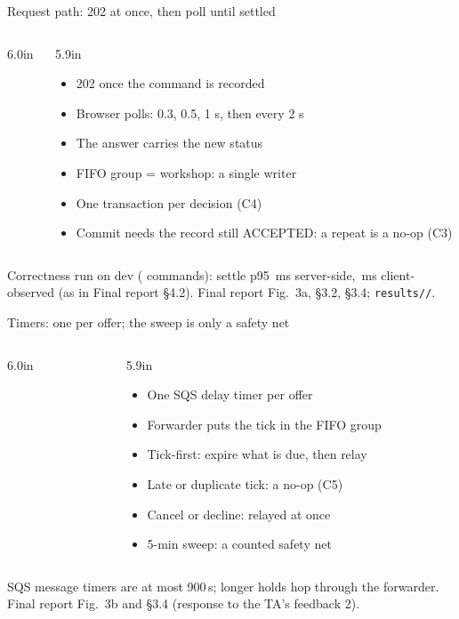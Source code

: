 \documentclass[t,20pt]{beamer}
\newcommand{\code}[1]{\texttt{#1}}
\newcommand{\source}[1]{\par\vfill{\fontsize{13}{15}\selectfont\color{srMuted}#1\par}\vspace{0.06in}}
\begin{document}
\begin{frame}{Request path: 202 at once, then poll until settled}
  \begin{columns}[T,onlytextwidth]
    \begin{column}{6.0in}
    \end{column}
    \begin{column}{5.9in}
      \vspace{0.30in}
      \begin{itemize}
        \setlength{\itemsep}{0.45em}
        \item 202 once the command is recorded
        \item Browser polls: 0.3, 0.5, 1 s, then every 2 s
        \item The answer carries the new status
        \item FIFO group = workshop: a single writer
        \item One transaction per decision (C4)
        \item Commit needs the record still ACCEPTED: a repeat is a no-op (C3)
      \end{itemize}
    \end{column}
  \end{columns}
  \source{Correctness run on dev (\CorrectnessSettleClientN{} commands): settle p95 \CorrectnessSettleServerPNinetyFiveMs\,ms
    server-side, \CorrectnessSettleClientPNinetyFiveMs\,ms client-observed (as in Final report \S4.2). Final report
    Fig.~3a, \S3.2, \S3.4; \code{results/\CorrectnessDir/}.}
\end{frame}

\begin{frame}{Timers: one per offer; the sweep is only a safety net}
  \begin{columns}[T,onlytextwidth]
    \begin{column}{6.0in}
    \end{column}
    \begin{column}{5.9in}
      \vspace{0.30in}
      \begin{itemize}
        \setlength{\itemsep}{0.45em}
        \item One SQS delay timer per offer
        \item Forwarder puts the tick in the FIFO group
        \item Tick-first: expire what is due, then relay
        \item Late or duplicate tick: a no-op (C5)
        \item Cancel or decline: relayed at once
        \item 5-min sweep: a counted safety net
      \end{itemize}
    \end{column}
  \end{columns}
  \source{SQS message timers are at most 900\,s; longer holds hop through the forwarder. Final report
    Fig.~3b and \S3.4 (response to the TA's feedback 2).}
\end{frame}
\end{document}
